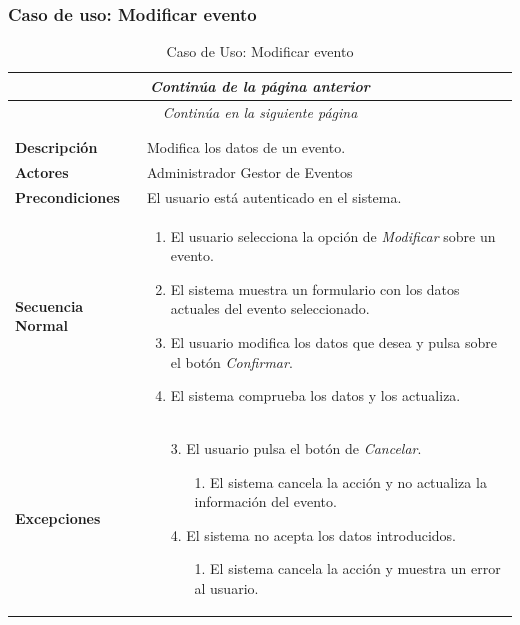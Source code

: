 \newpage
\subsubsection*{Caso de uso: Modificar evento }
\begin{longtable}{| p{4cm} | p{10cm} |}
\endfirsthead
\multicolumn{2}{c}{\textit{Continúa de la página anterior}}\\[12pt]
\hline
\endhead
\hline
\multicolumn{2}{c}{\textit{Continúa en la siguiente página}} \\
\endfoot
\hline
\caption{Caso de Uso: Modificar evento}\label{fig:1}\\
\endlastfoot


\hline
\multicolumn{2}{|c|}{\textbf{CU$<$39$>$ - Modificar Evento}} \\

\hline
\textbf{Descripción} &
Modifica los datos de un evento.\\

\hline
\textbf{Actores} &
Administrador\newline
Gestor de Eventos\\

\hline
\textbf{Precondiciones} &
El usuario está autenticado en el sistema.\\

\hline
\textbf{Secuencia Normal} &\mbox{}\par\vspace{-\baselineskip}
\begin{enumerate}[leftmargin=0.7cm, topsep=0.1cm]
\item El usuario selecciona la opción de \textit{Modificar} sobre un evento.
\item El sistema muestra un formulario con los datos actuales del evento seleccionado.
\item El usuario modifica los datos que desea y pulsa sobre el botón \textit{Confirmar}.
\item El sistema comprueba los datos y los actualiza.
\end{enumerate}


\\
\hline
\textbf{Excepciones} &\mbox{}\par\vspace{-\baselineskip}
\begin{enumerate}[leftmargin=0.9cm, topsep=0.1cm]
\item[3.] El usuario pulsa el botón de \textit{Cancelar}.
	\begin{itemize}
	\item[1.] El sistema cancela la acción y no actualiza la información del evento.
	\end{itemize}
\item[4.] El sistema no acepta los datos introducidos.
	\begin{itemize}
	\item[1.] El sistema cancela la acción y muestra un error al usuario.
	\end{itemize}
\end{enumerate}
\\


\end{longtable}
